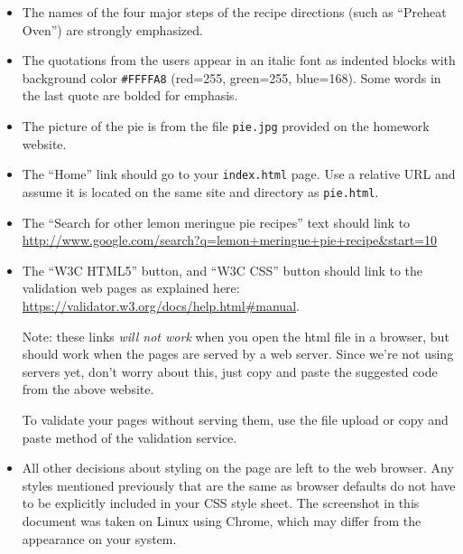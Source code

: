 \documentclass{article}
\begin{document}
\begin{itemize}
    \item The names of the four major steps of the recipe directions
      (such as ``Preheat Oven'') are strongly emphasized.
    \item The quotations from the users appear in an italic font as
      indented blocks with background color {\tt \#FFFFA8} (red=255,
      green=255, blue=168). Some words in the last quote are bolded
      for emphasis.
    \item The picture of the pie is from the file {\tt pie.jpg}
      provided on the homework website.
    \item The ``Home'' link should go to
      your \verb|index.html| page. Use a relative URL and assume it is
      located on the same site and directory as \verb|pie.html|.
    \item The
      ``Search for other lemon meringue pie recipes'' text
      should link to \\
      \url{http://www.google.com/search?q=lemon+meringue+pie+recipe&start=10}
    \item The ``W3C HTML5'' button, and ``W3C CSS'' button should
      link to the validation web pages as explained here:
      \url{https://validator.w3.org/docs/help.html#manual}.
      
      Note: these links {\em will not work} when you open the html
      file in a browser, but should work when the pages are served
      by a web server.  Since we're not using servers yet, don't
      worry about this, just copy and paste the suggested code from
      the above website.
      
      To validate your pages without serving them, use the file
      upload or copy and paste method of the validation service.
      
    \item All other decisions about styling on the page are left to
      the web browser. Any styles mentioned previously that are the
      same as browser defaults do not have to be explicitly included
      in your CSS style sheet. The screenshot in this document was
      taken on Linux using Chrome, which may differ from the
      appearance on your system.
  \end{itemize}
      
\end{document}
